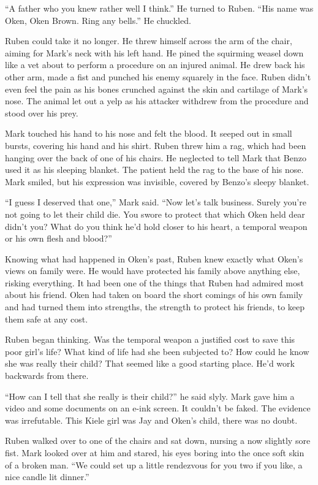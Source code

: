 ``A father who you knew rather well I think.''  He turned to Ruben.  ``His name was Oken, Oken Brown.  Ring any bells.''  He chuckled.

Ruben could take it no longer.  He threw himself across the arm of the chair, aiming for Mark's neck with his left hand.  He pined the squirming weasel down like a vet about to perform a procedure on an injured animal.  He drew back his other arm, made a fist and punched his enemy squarely in the face.  Ruben didn't even feel the pain as his bones crunched against the skin and cartilage of Mark's nose.  The animal let out a yelp as his attacker withdrew from the procedure and  stood over his prey.  

Mark touched his hand to his nose and felt the blood.  It seeped out in small bursts, covering his hand and his shirt.  Ruben threw him a rag, which had been hanging over the back of one of his chairs.  He neglected to tell Mark that Benzo used it as his sleeping blanket.  The patient held the rag to the base of his nose.  Mark smiled, but his expression was invisible, covered by Benzo's sleepy blanket.

``I guess I deserved that one,'' Mark said.  ``Now let's talk business.  Surely you're not going to let their child die.  You swore to protect that which Oken held dear didn't you?  What do you think he'd hold closer to his heart, a temporal weapon or his own flesh and blood?''

Knowing what had happened in Oken's past, Ruben knew exactly what Oken's views on family were.  He would have protected his family above anything else, risking everything.  It had been one of the things that Ruben had admired most about his friend.  Oken had taken on board the short comings of his own family and had turned them into strengths, the strength to protect his friends, to keep them safe at any cost.

Ruben began thinking.  Was the temporal weapon a justified cost to save this poor girl's life?  What kind of life had she been subjected to?  How could he know she was really their child?  That seemed like a good starting place.  He'd work backwards from there.

``How can I tell that she really is their child?'' he said slyly.  Mark gave him a video and some documents on an e-ink screen.  It couldn't be faked.  The evidence was irrefutable.  This Kiele girl was Jay and Oken's child, there was no doubt.

Ruben walked over to one of the chairs and sat down, nursing a now slightly sore fist.  Mark looked over at him and stared, his eyes boring into the once soft skin of a broken man.  ``We could set up a little rendezvous for you two if you like, a nice candle lit dinner.'' 

